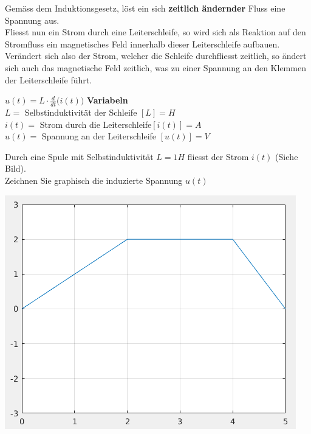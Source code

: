 \newpage



Gemäss dem Induktionsgesetz, löst ein sich \textbf{zeitlich ändernder} Fluss eine Spannung aus. \\
Fliesst nun ein Strom durch eine Leiterschleife, so wird sich als Reaktion auf den Stromfluss ein magnetisches Feld innerhalb dieser Leiterschleife aufbauen.  \\
Verändert sich also der Strom, welcher die Schleife durchfliesst zeitlich, so ändert sich auch das magnetische Feld zeitlich, was zu einer Spannung an den Klemmen der Leiterschleife führt.

\begingl
\begin{center}

\fspace

\end{center}


\formulaBegin
$u(t) = L \cdot \frac{d}{dt}\big( i(t) \big) $
\formulaEnd
\textbf{Variabeln} \\
$L =$ Selbstinduktivität der Schleife $ [L] = H$ \\
$i(t) =$ Strom durch die Leiterschleife$ [i(t)] = A$ \\
$u(t) = $ Spannung an der Leiterschleife $[u(t)] = V$
\iend

\beginbsp
Durch eine Spule mit Selbstinduktivität $L = 1 H$ fliesst der Strom $i(t)$ (Siehe Bild). \\
Zeichnen Sie graphisch die induzierte Spannung $u(t)$
\begin{center}
  \includegraphics[scale=0.5]{img/selbstind-a1}
\end{center}

